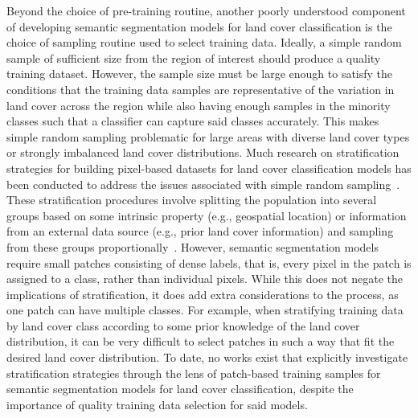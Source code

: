 Beyond the choice of pre-training routine, another poorly understood component of developing semantic segmentation models for land cover classification is the choice of sampling routine used to select training data.
Ideally, a simple random sample of sufficient size from the region of interest should produce a quality training dataset.
However, the sample size must be large enough to satisfy the conditions that the training data samples are representative of the variation in land cover across the region while also having enough samples in the minority classes such that a classifier can capture said classes accurately.
This makes simple random sampling problematic for large areas with diverse land cover types or strongly imbalanced land cover distributions.
Much research on stratification strategies for building pixel-based datasets for land cover classification models has been conducted to address the issues associated with simple random sampling~\citep{ zhenImpactTrainingValidation2013,canoImprovedForestcoverMapping2017, stehmanImpactSampleSize2012}.
These stratification procedures involve splitting the population into several groups based on some intrinsic property (e.g., geospatial location) or information from an external data source (e.g., prior land cover information) and sampling from these groups proportionally~\citep{costaSpatiallyStratifiedMultiStage2022, wangMeasureSpatialStratified2016,freemanEvaluatingEffectivenessDownsampling2012}.
However, semantic segmentation models require small patches consisting of dense labels, that is, every pixel in the patch is assigned to a class, rather than individual pixels.
While this does not negate the implications of stratification, it does add extra considerations to the process, as one patch can have multiple classes.
For example, when stratifying training data by land cover class according to some prior knowledge of the land cover distribution, it can be very difficult to select patches in such a way that fit the desired land cover distribution.
To date, no works exist that explicitly investigate stratification strategies through the lens of patch-based training samples for semantic segmentation models for land cover classification, despite the importance of quality training data selection for said models.

